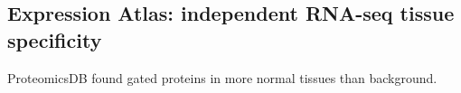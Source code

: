 \subsection{Expression Atlas: independent RNA-seq tissue specificity}
\label{sec:eatlas}
ProteomicsDB found gated proteins in more normal tissues than background.
